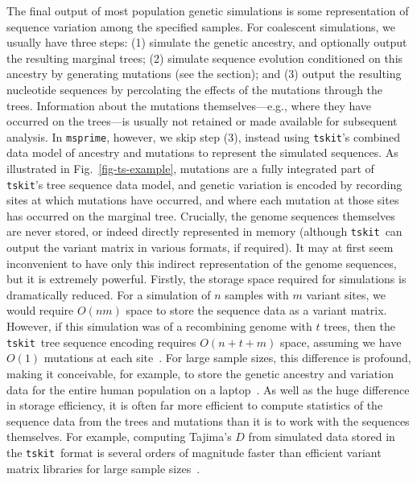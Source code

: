 \documentclass{article}
\newcommand{\msprime}[0]{\texttt{msprime}}
\newcommand{\tskit}[0]{\texttt{tskit}}
\begin{document}
The final output of most population genetic simulations is some representation
of sequence variation among the specified samples. For coalescent
simulations, we usually have three steps: (1) simulate
the genetic ancestry, and optionally output the resulting marginal trees;
(2) simulate sequence evolution conditioned on this ancestry by generating
mutations (see the  section); and (3) output the
resulting nucleotide sequences by percolating the effects of the mutations through
the trees. Information about the mutations
themselves---e.g., where they have occurred on the
trees---is usually not retained or made available for subsequent analysis.
In \msprime, however, we skip step (3), instead using \tskit's
combined data model of ancestry and mutations
to represent the simulated sequences.
As illustrated in Fig.~\ref{fig-ts-example}, mutations are a
fully integrated part of \tskit's tree sequence data model, and genetic
variation is encoded by recording sites at which mutations
have occurred, and where each mutation at those sites
has occurred on the marginal tree.
Crucially, the genome sequences themselves are never stored, or indeed directly
represented in memory (although \tskit\ can output the variant matrix
in various formats, if required).
It may at first seem inconvenient to have only this indirect representation
of the genome sequences, but it is extremely powerful.
Firstly, the storage space required for simulations is dramatically
reduced. For a simulation of $n$ samples with $m$ variant sites,
we would require $O(nm)$ space to store the sequence data as a variant
matrix. However, if this simulation was of a recombining genome
with $t$ trees, then the \tskit\ tree sequence encoding
requires $O(n + t + m)$ space,
assuming we have $O(1)$ mutations at each site~\citep{kelleher2016efficient}.
For large sample sizes, this difference is profound, making it
conceivable, for example, to store the genetic ancestry
and variation data for the entire human population on a
laptop~\citep{kelleher2019inferring}. As well as the huge
difference in storage efficiency, it is often far more efficient
to compute statistics of the sequence data from the
trees and mutations than it is to work with the sequences themselves.
For example, computing Tajima's $D$ from simulated data stored in the \tskit\ format
is several orders of magnitude faster than efficient variant matrix
libraries for large sample sizes~\citep{ralph2020efficiently}.
\end{document}
